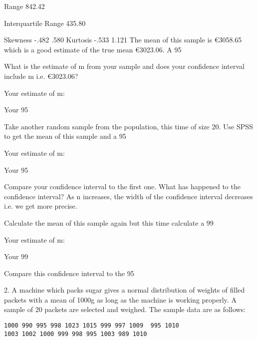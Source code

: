 Range
842.42
 
Interquartile Range
435.80
 
Skewness
-.482
.580
Kurtosis
-.533
1.121
The mean of this sample is €3058.65 which is a good estimate of the true mean €3023.06. A 95%

What is the estimate of m from your sample and does your confidence interval include m i.e. €3023.06?

Your estimate of m:

Your 95%

Take another random sample from the population, this time of size 20. Use SPSS to get the mean of this sample and a 95%

Your estimate of m:

Your 95%

Compare your confidence interval to the first one. What has happened to the confidence interval? As n increases, the width of the confidence interval decreases i.e. we get more precise.

Calculate the mean of this sample again but this time calculate a 99%

Your estimate of m:

Your 99%

Compare this confidence interval to the 95%

 

2. A machine which packs sugar gives a normal distribution of weights of filled packets with a mean of 1000g as long as the machine is working properly. A sample of 20 packets are selected and weighed. The sample data are as follows:
 
\begin{framed}
\begin{verbatim} 
1000 990 995 998 1023 1015 999 997 1009  995 1010
1003 1002 1000 999 998 995 1003 989 1010
\end{verbatim}
\end{framed}
 
